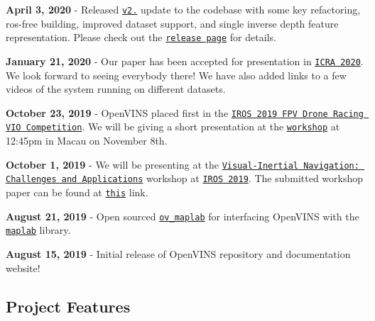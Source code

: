 \begin{DoxyItemize}
\item {\bfseries April 3, 2020} -\/ Released \href{https://github.com/rpng/open_vins/releases/tag/v2.0}{\tt v2.} update to the codebase with some key refactoring, ros-\/free building, improved dataset support, and single inverse depth feature representation. Please check out the \href{https://github.com/rpng/open_vins/releases/tag/v2.0}{\tt release page} for details.
\item {\bfseries January 21, 2020} -\/ Our paper has been accepted for presentation in \href{https://www.icra2020.org/}{\tt I\+C\+RA 2020}. We look forward to seeing everybody there! We have also added links to a few videos of the system running on different datasets.
\item {\bfseries October 23, 2019} -\/ Open\+V\+I\+NS placed first in the \href{http://rpg.ifi.uzh.ch/uzh-fpv.html}{\tt I\+R\+OS 2019 F\+PV Drone Racing V\+IO Competition}. We will be giving a short presentation at the \href{https://wp.nyu.edu/workshopiros2019mav/}{\tt workshop} at 12\+:45pm in Macau on November 8th.
\item {\bfseries October 1, 2019} -\/ We will be presenting at the \href{http://udel.edu/~ghuang/iros19-vins-workshop/index.html}{\tt Visual-\/\+Inertial Navigation\+: Challenges and Applications} workshop at \href{https://www.iros2019.org/}{\tt I\+R\+OS 2019}. The submitted workshop paper can be found at \href{http://udel.edu/~ghuang/iros19-vins-workshop/papers/06.pdf}{\tt this} link.
\item {\bfseries August 21, 2019} -\/ Open sourced \href{https://github.com/rpng/ov_maplab}{\tt ov\+\_\+maplab} for interfacing Open\+V\+I\+NS with the \href{https://github.com/ethz-asl/maplab}{\tt maplab} library.
\item {\bfseries August 15, 2019} -\/ Initial release of Open\+V\+I\+NS repository and documentation website!
\end{DoxyItemize}

\subsection*{Project Features}


